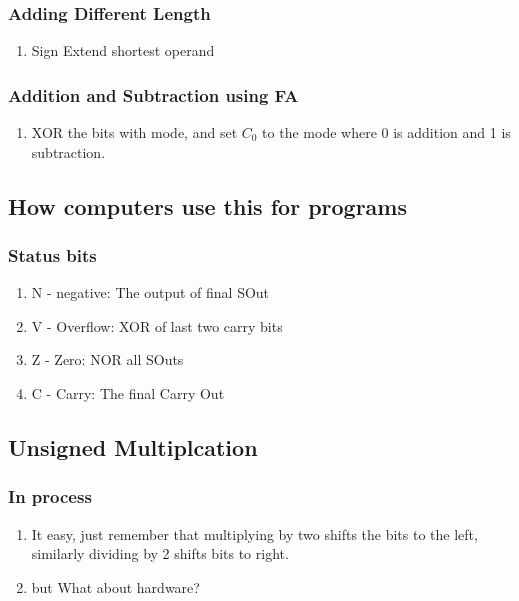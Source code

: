 \documentclass[11pt, a4paper]{article}
\begin{document}
\subsubsection{Adding Different Length}
\begin{enumerate}
    \item Sign Extend shortest operand
\end{enumerate}
\subsubsection{Addition and Subtraction using FA}
\begin{enumerate}
    \item XOR the bits with mode, and set $C_{0}$ to the mode where 0 is addition and 1 is subtraction.
\end{enumerate}
\subsection{How computers use this for programs}
\subsubsection{Status bits}
\begin{enumerate}
    \item N - negative: The output of final SOut
    \item V - Overflow: XOR of last two carry bits
    \item Z - Zero: NOR all SOuts
    \item C - Carry: The final Carry Out
\end{enumerate}
\subsection{Unsigned Multiplcation}
\subsubsection{In process}
\begin{enumerate}
    \item It easy, just remember that multiplying by two shifts the bits to the left, similarly dividing by 2 shifts bits to right.
    \item but What about hardware?
\end{enumerate}
\end{document}
